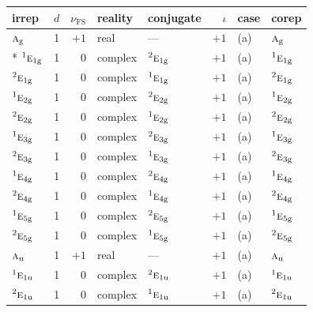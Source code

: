 \documentclass[10pt,a4paper]{article}
\numberwithin{equation}{section}
\newcommand{\irr}[1]{\text{\normalfont\scshape #1}}
\newcommand{\conjpair}[1]{{}^{#1}}
\newcommand{\ptag}[1]{\mathrm{#1}}
\newcommand{\fsind}{\nu_{\mathrm{FS}}}
\begin{document}
{\small\renewcommand{\arraystretch}{1.25}\setlength{\tabcolsep}{4pt}\begin{longtable}{@{}lrrllrll@{}}\toprule
irrep & $d$ & $\fsind$ & reality & conjugate & $\iota$ & case & corep\\\midrule\endhead
\bottomrule\endfoot\endlastfoot
$\irr{a}_{\ptag{g}}$ & 1 & $+1$ & real & --- & $+1$ & (a) & $\irr{a}_{\ptag{g}}$\\*
$\conjpair{1}\irr{e}_{1\ptag{g}}$ & 1 & $0$ & complex & $\conjpair{2}\irr{e}_{1\ptag{g}}$ & $+1$ & (a) & $\conjpair{1}\irr{e}_{1\ptag{g}}$\\
$\conjpair{2}\irr{e}_{1\ptag{g}}$ & 1 & $0$ & complex & $\conjpair{1}\irr{e}_{1\ptag{g}}$ & $+1$ & (a) & $\conjpair{2}\irr{e}_{1\ptag{g}}$\\
$\conjpair{1}\irr{e}_{2\ptag{g}}$ & 1 & $0$ & complex & $\conjpair{2}\irr{e}_{2\ptag{g}}$ & $+1$ & (a) & $\conjpair{1}\irr{e}_{2\ptag{g}}$\\
$\conjpair{2}\irr{e}_{2\ptag{g}}$ & 1 & $0$ & complex & $\conjpair{1}\irr{e}_{2\ptag{g}}$ & $+1$ & (a) & $\conjpair{2}\irr{e}_{2\ptag{g}}$\\
$\conjpair{1}\irr{e}_{3\ptag{g}}$ & 1 & $0$ & complex & $\conjpair{2}\irr{e}_{3\ptag{g}}$ & $+1$ & (a) & $\conjpair{1}\irr{e}_{3\ptag{g}}$\\
$\conjpair{2}\irr{e}_{3\ptag{g}}$ & 1 & $0$ & complex & $\conjpair{1}\irr{e}_{3\ptag{g}}$ & $+1$ & (a) & $\conjpair{2}\irr{e}_{3\ptag{g}}$\\
$\conjpair{1}\irr{e}_{4\ptag{g}}$ & 1 & $0$ & complex & $\conjpair{2}\irr{e}_{4\ptag{g}}$ & $+1$ & (a) & $\conjpair{1}\irr{e}_{4\ptag{g}}$\\
$\conjpair{2}\irr{e}_{4\ptag{g}}$ & 1 & $0$ & complex & $\conjpair{1}\irr{e}_{4\ptag{g}}$ & $+1$ & (a) & $\conjpair{2}\irr{e}_{4\ptag{g}}$\\
$\conjpair{1}\irr{e}_{5\ptag{g}}$ & 1 & $0$ & complex & $\conjpair{2}\irr{e}_{5\ptag{g}}$ & $+1$ & (a) & $\conjpair{1}\irr{e}_{5\ptag{g}}$\\
$\conjpair{2}\irr{e}_{5\ptag{g}}$ & 1 & $0$ & complex & $\conjpair{1}\irr{e}_{5\ptag{g}}$ & $+1$ & (a) & $\conjpair{2}\irr{e}_{5\ptag{g}}$\\
$\irr{a}_{\ptag{u}}$ & 1 & $+1$ & real & --- & $+1$ & (a) & $\irr{a}_{\ptag{u}}$\\
$\conjpair{1}\irr{e}_{1\ptag{u}}$ & 1 & $0$ & complex & $\conjpair{2}\irr{e}_{1\ptag{u}}$ & $+1$ & (a) & $\conjpair{1}\irr{e}_{1\ptag{u}}$\\
$\conjpair{2}\irr{e}_{1\ptag{u}}$ & 1 & $0$ & complex & $\conjpair{1}\irr{e}_{1\ptag{u}}$ & $+1$ & (a) & $\conjpair{2}\irr{e}_{1\ptag{u}}$\\

\end{longtable}}
\end{document}
